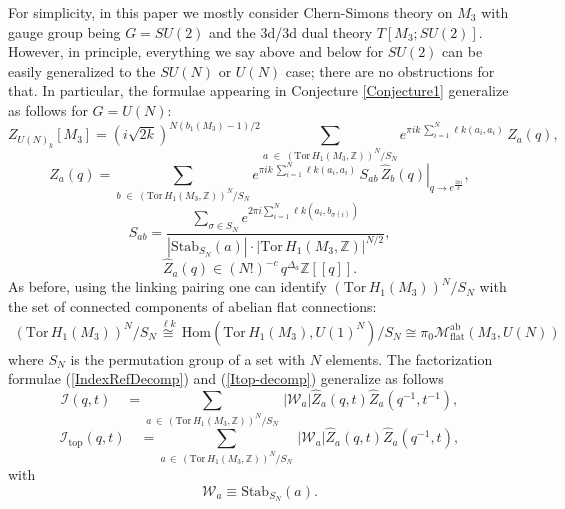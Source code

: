 \documentclass[hyper,letterpaper]{JHEP3}
\newcommand{\Z}{{\mathbb Z}}
\renewcommand{\hat}{\widehat}
\def\CI{{\mathcal I}}
\def\CM{{\mathcal M}}
\def\CW{{\mathcal W}}
\def\lk{{\ell k}}
\def\Tor{{\mathrm{Tor}\,}}
\def\top{{\text{top}}}
\begin{document}
For simplicity, in this paper we mostly consider Chern-Simons theory on $M_3$ with gauge group being $G=SU(2)$ and the 3d/3d dual theory $T[M_3;SU(2)]$. However, in principle, everything we say above and below for $SU(2)$ can be easily generalized to the $SU(N)$ or $U(N)$ case; there are no obstructions for that. In particular, the formulae appearing in Conjecture \ref{Conjecture1} generalize as follows for $G = U(N)$:
\begin{equation}
	Z_{U(N)_k}[M_3]=(i\sqrt{2k})^{N(b_1(M_3)-1)/2}\sum_{a\;\in \;(\Tor H_1(M_3,\Z))^{N}/S_N}e^{\pi ik\,\sum_{i=1}^N\lk(a_i,a_i)}\,Z_a(q),
\label{WRT-UN-decomp}
\end{equation}
\begin{equation}
Z_a(q)=\sum_{b\;\in \;(\Tor H_1(M_3,\Z))^{N}/S_N}e^{\pi ik\,\sum_{i=1}^N\lk(a_i,a_i)}\,S_{ab}
	\, \left.\hat{Z}_b(q)\right|_{q\rightarrow e^{\frac{2\pi i }{k}}},
\end{equation}
\begin{equation}
	S_{ab}=\frac{\sum_{\sigma\in S_N}e^{2\pi i \sum_{i=1}^N\lk(a_i,b_{\sigma(i)})}}{|\mathrm{Stab}_{S_N}(a)|\cdot|\Tor H_1(M_3,\Z)|^{N/2}},
\end{equation}
\begin{equation}
 \hat{Z}_a(q)\in (N!)^{-c}\,q^{\Delta_a}\Z[[q]].
\end{equation}
As before, using the linking pairing one can identify $(\Tor H_1(M_3))^N/S_N$ with the set of connected components of abelian flat connections:
\begin{multline}
	(\Tor H_1(M_3))^N/S_N\stackrel{\lk}{\cong}\, \mathrm{Hom}\left(\Tor H_1(M_3),U(1)^N\right)/S_N
 \cong \pi_0\CM_\text{flat}^\text{ab}(M_3,U(N))
\label{UN-ab-set}
\end{multline}
where $S_N$ is the permutation group of a set with $N$ elements.
The factorization formulae (\ref{IndexRefDecomp}) and (\ref{Itop-decomp}) generalize as follows
\begin{equation}
		\CI(q,t)\quad = \sum_{a\,\in\, (\Tor H_1(M_3,\Z))^N/S_N}\, |\CW_a|\hat{Z}_a(q,t)\hat{Z}_a(q^{-1},t^{-1}),
\label{I-UN-decomp}
\end{equation}
\begin{equation}
		\CI_\top(q,t) \quad =\sum_{a\,\in\, (\Tor H_1(M_3,\Z))^N/S_N}\, |\CW_a|\hat{Z}_a(q,t)\hat{Z}_a(q^{-1},t),
\label{Itop-UN-decomp}
\end{equation}
with
\begin{equation}
	\CW_a\equiv \text{Stab}_{S_N}(a).
\end{equation}
\end{document}
